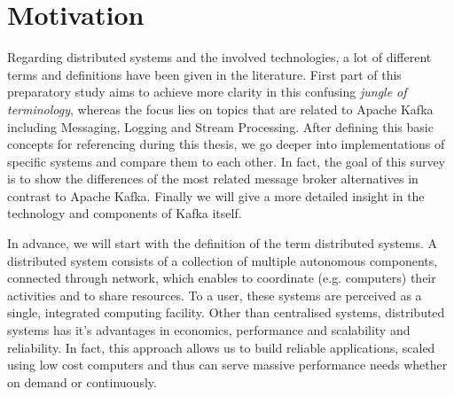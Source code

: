 \chapter{Motivation}
Regarding distributed systems and the involved technologies, a lot of different
terms and definitions have been given in the literature. First part of this
preparatory study aims to achieve more clarity in this confusing \textit{jungle of
terminology}, whereas the focus lies on topics that are related to Apache
Kafka including Messaging, Logging and Stream Processing. After defining this
basic concepts for referencing during this thesis, we go deeper into
implementations of specific systems and compare them to each other. In fact, the
goal of this survey is to show the differences of the most related message
broker alternatives in contrast to Apache Kafka. Finally we will give a more
detailed insight in the technology and components of Kafka itself.\\



In advance, we will start with the definition of the term distributed systems. A
distributed system consists of a collection of multiple autonomous components,
connected through network, which enables to coordinate  (e.g. computers) their
activities and to share resources. To a user, these systems are perceived as a
single, integrated computing facility. Other than centralised systems,
distributed systems has it's advantages in economics, performance and
scalability and reliability. In fact, this approach allows us to build reliable
applications, scaled using low cost computers and thus can serve massive
performance needs whether on demand or continuously.\cite{POSA1}\cite{TAN06}
